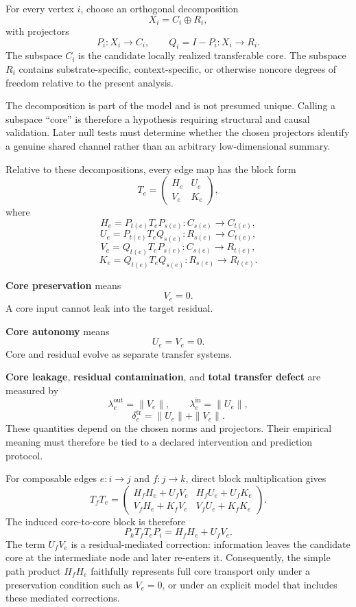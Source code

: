 \begin{SRWTdefinition}\label{SRWT:def:core-residual}
For every vertex \(i\), choose an orthogonal decomposition
\[
X_i=C_i\oplus R_i,
\]
with projectors
\[
P_i:X_i\to C_i,
\qquad
Q_i=I-P_i:X_i\to R_i.
\]
The subspace \(C_i\) is the candidate locally realized transferable core. The
subspace \(R_i\) contains substrate-specific, context-specific, or otherwise
noncore degrees of freedom relative to the present analysis.
\end{SRWTdefinition}

The decomposition is part of the model and is not presumed unique. Calling a
subspace ``core'' is therefore a hypothesis requiring structural and causal
validation. Later null tests must determine whether the chosen projectors
identify a genuine shared channel rather than an arbitrary low-dimensional
summary.

Relative to these decompositions, every edge map has the block form
\[
T_e=
\begin{pmatrix}
H_e & U_e\\
V_e & K_e
\end{pmatrix},
\]
where
\[
H_e=P_{t(e)}T_eP_{s(e)}:C_{s(e)}\to C_{t(e)},
\]
\[
U_e=P_{t(e)}T_eQ_{s(e)}:R_{s(e)}\to C_{t(e)},
\]
\[
V_e=Q_{t(e)}T_eP_{s(e)}:C_{s(e)}\to R_{t(e)},
\]
\[
K_e=Q_{t(e)}T_eQ_{s(e)}:R_{s(e)}\to R_{t(e)}.
\]


\textbf{Core preservation} means
\[
V_e=0.
\]
A core input cannot leak into the target residual.

\textbf{Core autonomy} means
\[
U_e=V_e=0.
\]
Core and residual evolve as separate transfer systems.

\textbf{Core leakage}, \textbf{residual contamination}, and \textbf{total
transfer defect} are measured by
\[
\lambda_e^{\mathrm{out}}=\|V_e\|,
\qquad
\lambda_e^{\mathrm{in}}=\|U_e\|,
\]
\[
\delta_e^{\mathrm{tr}}
=
\|U_e\|+\|V_e\|.
\]
These quantities depend on the chosen norms and projectors. Their empirical
meaning must therefore be tied to a declared intervention and prediction
protocol.


For composable edges \(e:i\to j\) and \(f:j\to k\), direct block
multiplication gives
\[
T_fT_e
=
\begin{pmatrix}
H_fH_e+U_fV_e & H_fU_e+U_fK_e\\
V_fH_e+K_fV_e & V_fU_e+K_fK_e
\end{pmatrix}.
\]
The induced core-to-core block is therefore
\[
P_kT_fT_eP_i
=
H_fH_e+U_fV_e.
\]
The term \(U_fV_e\) is a residual-mediated correction: information leaves the
candidate core at the intermediate node and later re-enters it. Consequently,
the simple path product \(H_fH_e\) faithfully represents full core transport
only under a preservation condition such as \(V_e=0\), or under an explicit
model that includes these mediated corrections.

